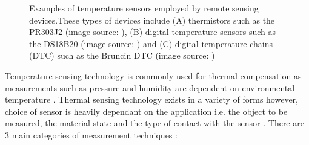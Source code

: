 \begin{figure}[H]
	\centering
	\begin{subfigure}[b]{0.3\textwidth}
	\end{subfigure}%
	\hfill
	\begin{subfigure}[b]{0.3\textwidth}
	\end{subfigure}%
	\hfill
	\begin{subfigure}[b]{0.3\textwidth}
	\end{subfigure}%
	\hfill
	\caption{Examples of temperature sensors employed by remote sensing devices.These types of devices include (A) thermistors such as the PR303J2 (image source: \cite{pr303J2}), (B) digital temperature sensors such as the DS18B20 (image source: \cite{ds18b20}) and (C) digital temperature chains (DTC) such as the Bruncin DTC (image source: \cite{bruncindtc}) } 
	\label{fig:temp_examples}
\end{figure}

Temperature sensing technology is commonly used for thermal compensation as measurements such as pressure and humidity are dependent on environmental temperature \cite{mansoor2015silicon}. Thermal sensing technology exists in a variety of forms however, choice of sensor is heavily dependant on the application i.e. the object to be measured, the material state and the type of contact with the sensor \cite{mansoor2015silicon,childs2000review}. There are 3 main categories of measurement techniques \cite{childs2000review}:

